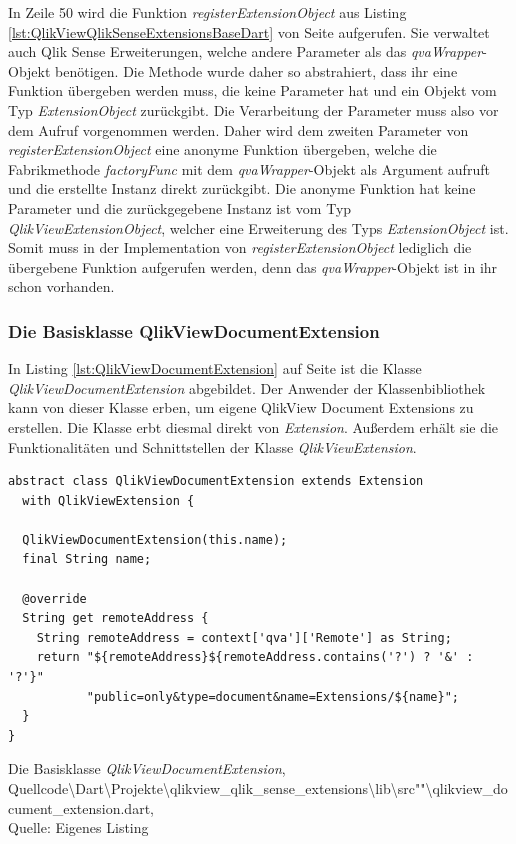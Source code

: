 In Zeile 50 wird die Funktion \textit{registerExtensionObject} aus Listing \ref{lst:QlikViewQlikSenseExtensionsBaseDart} von Seite \pageref{lst:QlikViewQlikSenseExtensionsBaseDart} aufgerufen. Sie verwaltet auch Qlik Sense Erweiterungen, welche andere Parameter als das \textit{qvaWrapper}-Objekt benötigen. Die Methode wurde daher so abstrahiert, dass ihr eine Funktion übergeben werden muss, die keine Parameter hat und ein Objekt vom Typ \textit{ExtensionObject} zurückgibt. Die Verarbeitung der Parameter muss also vor dem Aufruf vorgenommen werden. Daher wird dem zweiten Parameter von \textit{registerExtensionObject} eine anonyme Funktion übergeben, welche die Fabrikmethode \textit{factoryFunc} mit dem \textit{qvaWrapper}-Objekt als Argument aufruft und die erstellte Instanz direkt zurückgibt. Die anonyme Funktion hat keine Parameter und die zurückgegebene Instanz ist vom Typ \textit{QlikViewExtensionObject}, welcher eine Erweiterung des Typs \textit{ExtensionObject} ist. Somit muss in der Implementation von \textit{registerExtensionObject} lediglich die übergebene Funktion aufgerufen werden, denn das \textit{qvaWrapper}-Objekt ist in ihr schon vorhanden. 


\subsubsection{Die Basisklasse QlikViewDocumentExtension}
\label{lab:DieBasisklasseQlikViewDocumentExtension}

In Listing \ref{lst:QlikViewDocumentExtension} auf Seite \pageref{lst:QlikViewDocumentExtension} ist die Klasse \textit{QlikViewDocumentExtension} abgebildet. Der Anwender der Klassen\-bibliothek kann von dieser Klasse erben, um eigene QlikView Document Extensions zu erstellen. Die Klasse erbt diesmal direkt von \textit{Extension}. Außerdem erhält sie die Funktionalitäten und Schnittstellen der Klasse \textit{QlikViewExtension}.

\begin{listing}[htbp]
\begin{verbatim}
abstract class QlikViewDocumentExtension extends Extension
  with QlikViewExtension {

  QlikViewDocumentExtension(this.name);  
  final String name;

  @override
  String get remoteAddress {
    String remoteAddress = context['qva']['Remote'] as String;
    return "${remoteAddress}${remoteAddress.contains('?') ? '&' : '?'}"
           "public=only&type=document&name=Extensions/${name}";
  }
}
\end{verbatim}
\caption[Die Basisklasse \textit{QlikViewDocumentExtension}]{Die Basisklasse \textit{QlikViewDocumentExtension}, \\Quellcode\textbackslash{}Dart\textbackslash{}Projekte\textbackslash{}qlikview\_qlik\_sense\_extensions\textbackslash{}lib\textbackslash{}src""\textbackslash{}qlikview\_document\_extension.dart, \\Quelle: Eigenes Listing}
\label{lst:QlikViewDocumentExtension}
\end{listing}

